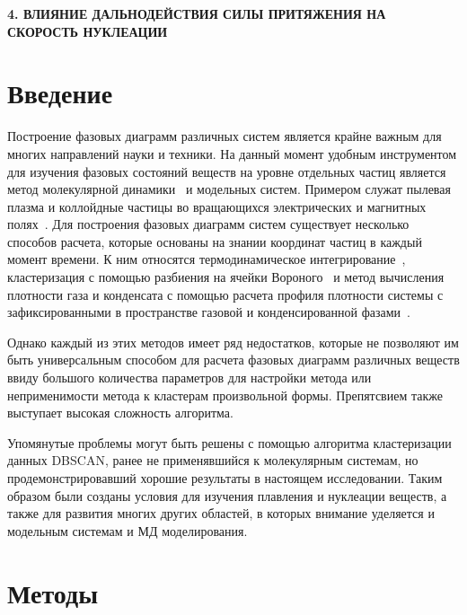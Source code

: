 \newpage
\begin{center}
  \textbf{\large 4. ВЛИЯНИЕ ДАЛЬНОДЕЙСТВИЯ СИЛЫ ПРИТЯЖЕНИЯ НА СКОРОСТЬ НУКЛЕАЦИИ}
\end{center}

\section{Введение}
\label{PRIMe-SecIntroduction}

Построение фазовых диаграмм различных систем является крайне важным для многих направлений науки и техники.
На данный момент удобным инструментом для изучения фазовых состояний веществ на уровне отдельных частиц является метод молекулярной динамики~\cite{10.1063/1.1730376, 10.1006/jcph.1995.1039} и модельных систем.
Примером служат пылевая плазма и коллойдные частицы во вращающихся электрических и магнитных полях~\cite{10.1038/s41598-017-14001-y, 10.1103/physreve.103.022608, 10.1103/physreve.96.043201}.
Для построения фазовых диаграмм систем существует несколько способов расчета, которые основаны на знании координат частиц в каждый момент времени.
К ним относятся термодинамическое интегрирование~\cite{10.1088/0953-8984/21/46/465104}, кластеризация с помощью разбиения на ячейки Вороного~\cite{10.1021/acs.jpcc.7b09317} и метод вычисления плотности газа и конденсата с помощью расчета профиля плотности системы с зафиксированными в пространстве газовой и конденсированной фазами~\cite{10.1021/jp806127j, 10.1021/jp1117213}.

Однако каждый из этих методов имеет ряд недостатков, которые не позволяют им быть универсальным способом для расчета фазовых диаграмм различных веществ ввиду большого количества параметров для настройки метода или неприменимости метода к кластерам произвольной формы.
Препятсвием также выступает высокая сложность алгоритма.

Упомянутые проблемы могут быть решены с помощью алгоритма кластеризации данных DBSCAN, ранее не применявшийся к молекулярным системам, но продемонстрировавший хорошие результаты в настоящем исследовании.
Таким образом были созданы условия для изучения плавления и нуклеации веществ, а также для развития многих других областей, в которых внимание уделяется и модельным системам и МД моделирования.


\section{Методы}
\label{PRIMe-SecMethods}


